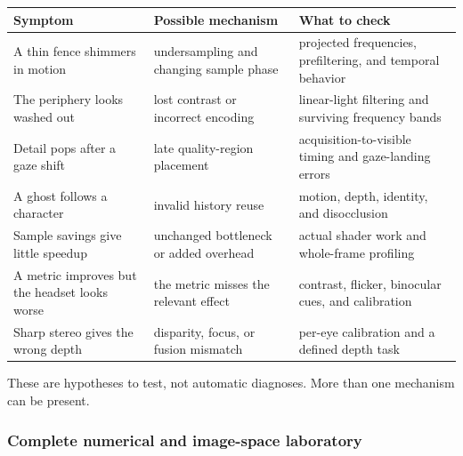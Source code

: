 \hypertarget{04-visual-computing-ii-ch042-diagnose-a-symptom-by-the-quantity-that-failed}{}

{\def\LTcaptype{none} %
\begin{longtable}[]{@{}
  >{\raggedright\arraybackslash}p{}
  >{\raggedright\arraybackslash}p{}
  >{\raggedright\arraybackslash}p{}@{}}
\toprule\noalign{}
\begin{minipage}[b]{\linewidth}\raggedright
Symptom
\end{minipage} & \begin{minipage}[b]{\linewidth}\raggedright
Possible mechanism
\end{minipage} & \begin{minipage}[b]{\linewidth}\raggedright
What to check
\end{minipage} \\
\midrule\noalign{}
\endhead
\bottomrule\noalign{}
\endlastfoot
A thin fence shimmers in motion & undersampling and changing sample phase & projected frequencies, prefiltering, and temporal behavior \\
The periphery looks washed out & lost contrast or incorrect encoding & linear-light filtering and surviving frequency bands \\
Detail pops after a gaze shift & late quality-region placement & acquisition-to-visible timing and gaze-landing errors \\
A ghost follows a character & invalid history reuse & motion, depth, identity, and disocclusion \\
Sample savings give little speedup & unchanged bottleneck or added overhead & actual shader work and whole-frame profiling \\
A metric improves but the headset looks worse & the metric misses the relevant effect & contrast, flicker, binocular cues, and calibration \\
Sharp stereo gives the wrong depth & disparity, focus, or fusion mismatch & per-eye calibration and a defined depth task \\
\end{longtable}
}

These are hypotheses to test, not automatic diagnoses. More than one mechanism can be present.

\subsubsection{Complete numerical and image-space laboratory}\label{04-visual-computing-ii-ch042-complete-numerical-and-image-space-laboratory}

